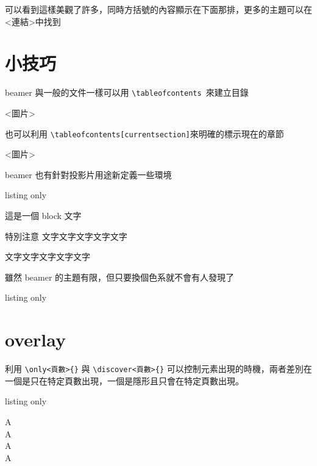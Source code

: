 可以看到這樣美觀了許多，同時方括號的內容顯示在下面那排，更多的主題可以在<連結>中找到

\section{小技巧}

beamer 與一般的文件一樣可以用 \verb`\tableofcontents `來建立目錄

<圖片>

也可以利用 \verb`\tableofcontents[currentsection]`來明確的標示現在的章節

<圖片>

beamer 也有針對投影片用途新定義一些環境

\begin{tcblisting}{listing only}
\begin{block}{這是一個 block}
文字
\end{block}

\begin{alertblock}{特別注意}
文字文字文字文字文字
\end{alertblock}

\begin{examples}
文字文字文字文字文字
\end{examples}
\end{tcblisting}

雖然 beamer 的主題有限，但只要換個色系就不會有人發現了

\begin{tcblisting}{listing only}
\end{tcblisting}

\section{overlay}

利用 \verb`\only<頁數>{}` 與 \verb`\discover<頁數>{}` 可以控制元素出現的時機，兩者差別在一個是只在特定頁數出現，一個是隱形且只會在特定頁數出現。

\begin{tcblisting}{listing only}
\begin{center}
A\\
A\\
A\\
A\\
\end{center}
\end{tcblisting}

